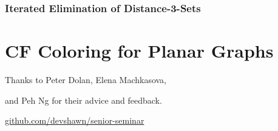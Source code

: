 \documentclass[xcolor=dvipsnames,aspectratio=1610]{beamer}
\begin{document}
  \begin{frame}
    \frametitle{Iterated Elimination of Distance-3-Sets}

    

  \end{frame}

  \section{CF Coloring for Planar Graphs}

  \begin{frame}[standout]
    \centering
    {Thanks to Peter Dolan, Elena Machkasova,

    and Peh Ng for their advice and feedback.}
    \vfill
    \href{https://github.com/devshawn/senior-seminar}{github.com/devshawn/senior-seminar}
    \vfill
    \ccbyncsa{}
  \end{frame}
\end{document}
